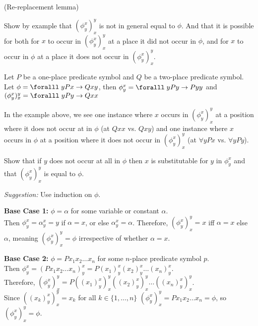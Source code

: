 \begin{problem}[9]
  (Re-replacement lemma)
  
  \begin{enumalph}
    \item Show by example that $(\phi^x_y)^y_x$ is not in general equal to $\phi$.
      And that it is possible for both for $x$ to occur in $(\phi^x_y)^y_x$
      at a place it did not occur in $\phi$, and for $x$ to occur in $\phi$
      at a place it does not occur in $(\phi^x_y)^y_x$.

      \begin{Answer}
        Let $P$ be a one-place predicate symbol and $Q$ be a two-place predicate symbol.\\
        Let $\phi = \forall y P x \lto Qxy$, then $\phi^x_y = \forall y Py \lto Pyy$ and
        $(\phi^x_y)^y_x = \forall y Py \lto Qxx$
        


        \step
        In the example above, we see one instance where $x$ occurs in $(\phi^x_y)^y_x$ at a position
        where it does not occur at in $\phi$ (at $Qxx$ vs. $Qxy$)
        and one instance where $x$ occurs in $\phi$ at a position
        where it does not occur in $(\phi^x_y)^y_x$ (at $\forall y Px$ vs. $\forall y Py$).
      \end{Answer}



    \item Show that if $y$ does not  occur at all in $\phi$ then $x$ is substitutable
      for $y$ in $\phi^x_y$ and that $(\phi^x_y)^y_x$ is equal to $\phi$.

      \step
      \emph{Suggestion: } Use induction on $\phi$.

      \begin{Answer}
        \step
        \textbf{Base Case 1:} $\phi = \alpha$ for some variable or constant $\alpha$.\\
        Then $\phi^x_y = \alpha^x_y = y$ if $\alpha = x$, or else $\alpha^x_y = \alpha$.
        Therefore, $(\phi^x_y)^y_x = x$ iff $\alpha = x$ else $\alpha$,
        meaning $(\phi^x_y)^y_x = \phi$ irrespective of whether $\alpha = x$.
  
        \step
        \textbf{Base Case 2:} $\phi = P x_1 x_2 \ldots x_n$ for some $n$-place predicate symbol $p$.\\
        Then $\phi^x_y = (P x_1 x_2 \ldots x_n)^x_y = P (x_1)^x_y (x_2)^x_y \ldots (x_n)^x_y$.\\
        Therefore, $(\phi^x_y)^y_x = P ((x_1)^x_y)^y_x ((x_2)^x_y)^y_x \ldots ((x_n)^x_y)^y_x$. \\
        Since $((x_k)^x_y)^y_x = x_k$ for all $k \in \{1, \ldots, n\}$
        $(\phi^x_y)^y_x = P x_1 x_2 \ldots x_n = \phi$, so $(\phi^x_y)^y_x = \phi$.
  

\end{Answer}
\end{enumalph}
\end{problem}
